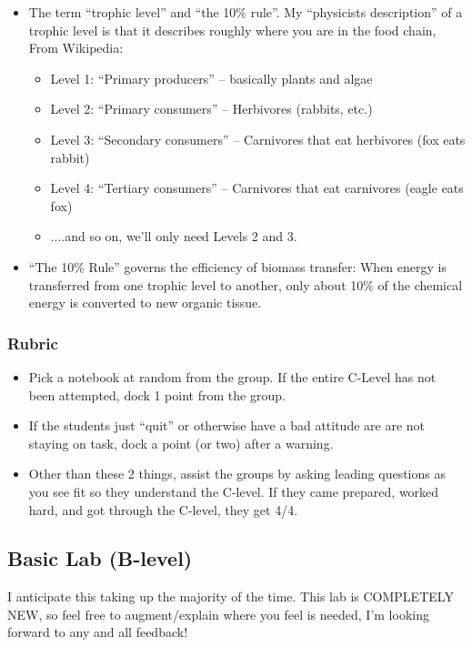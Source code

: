 \documentclass[fleqn,letterpaper]{article}
\begin{document}
\begin{itemize}
{\begin{itemize}
    \item{The term ``trophic level'' and ``the 10\% rule''.  My ``physicists description'' of a trophic level is that it describes roughly where you are in the food chain, From Wikipedia:
    \begin{itemize}
    \item{Level 1: ``Primary producers'' -- basically plants and algae}
    \item{Level 2: ``Primary consumers'' -- Herbivores (rabbits, etc.)}
    \item{Level 3: ``Secondary consumers'' -- Carnivores that eat herbivores (fox eats rabbit)}
    \item{Level 4:  ``Tertiary consumers'' -- Carnivores that eat carnivores (eagle eats fox)}
    \item{....and so on, we'll only need Levels 2 and 3}.
    \end{itemize}}
    \item{``The 10\% Rule'' governs the efficiency of biomass transfer:  When energy is transferred from one trophic level to another, only about 10\% of the chemical energy is converted to new organic tissue.}
    \end{itemize}}
 \end{itemize}

\subsubsection*{Rubric}

\begin{itemize}
 \item{Pick a notebook at random from the group.  If the entire C-Level has not been attempted, dock 1 point from the group.}
 \item{If the students just ``quit'' or otherwise have a bad attitude are are not staying on task, dock a point (or two) after a warning.}
 \item{Other than these 2 things, assist the groups by asking leading questions as you see fit so they understand the C-level.  If they came prepared, worked hard, and got through the C-level, they get 4/4.}
\end{itemize}


\subsection*{Basic Lab (B-level)}

I anticipate this taking up the majority of the time. This lab is COMPLETELY NEW, so feel free to augment/explain where you feel is needed, I'm looking forward to any and all feedback!
\end{document}
